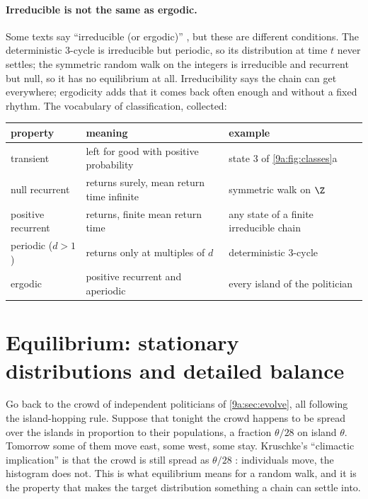 \paragraph{Irreducible is not the same as ergodic.}
Some texts say ``irreducible (or ergodic)'' , but these are different
conditions. The deterministic 3-cycle is irreducible but periodic, so its distribution at time
$t$ never settles; the symmetric random walk on the integers is irreducible and recurrent but
null, so it has no equilibrium at all. Irreducibility says the chain can get everywhere;
ergodicity adds that it comes back often enough and without a fixed rhythm. The vocabulary of
classification, collected:
\begin{center}
\small
\begin{tabularx}{\linewidth}{@{}lXl@{}}
\toprule
property & meaning & example \\
\midrule
transient & left for good with positive probability & state 3 of \cref{9a:fig:classes}a\\
null recurrent & returns surely, mean return time infinite & symmetric walk on $\Z$\\
positive recurrent & returns, finite mean return time & any state of a finite irreducible chain\\
periodic ($d>1$) & returns only at multiples of $d$ & deterministic 3-cycle\\
ergodic & positive recurrent and aperiodic & every island of the politician\\
\bottomrule
\end{tabularx}
\end{center}
\section{Equilibrium: stationary distributions and detailed balance}
\label{9a:sec:stationary}

Go back to the crowd of independent politicians of \cref{9a:sec:evolve}, all following the
island-hopping rule. Suppose that tonight the crowd happens to be spread over the islands in
proportion to their populations, a fraction $\theta/28$ on island $\theta$. Tomorrow some of
them move east, some west, some stay. Kruschke's ``climactic implication'' is that the crowd is
still spread as $\theta/28$ : individuals move, the histogram does
not. This is what equilibrium means for a random walk, and it is the property that makes the
target distribution something a chain can settle into.

